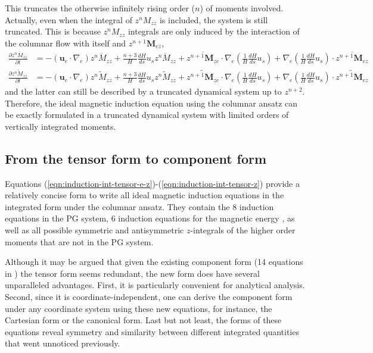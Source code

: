 This truncates the otherwise infinitely rising order ($n$) of moments involved. Actually, even when the integral of $z^nM_{zz}$ is included, the system is still truncated. This is because $z^n M_{zz}$ integrals are only induced by the interaction of the columnar flow with itself and $z^{n+1} \mathbf{M}_{ez}$,
\begin{equation}\label{eqn:induction-int-tensor-z}
\begin{aligned}
    \frac{\partial \overline{z^n M_{zz}}}{\partial t} &= - (\mathbf{u}_e\cdot \nabla_e) \overline{z^n M_{zz}} + \frac{n+3}{H}\frac{dH}{ds} u_s \overline{z^n M_{zz}} + \overline{z^{n+1} \mathbf{M}_{ze}}\cdot \nabla_e \left(\frac{1}{H}\frac{dH}{ds}u_s\right) + \nabla_e \left(\frac{1}{H}\frac{dH}{ds}u_s\right) \cdot \overline{z^{n+1} \mathbf{M}_{ez}} \\ 
    \frac{\partial \widetilde{z^n M_{zz}}}{\partial t} &= - (\mathbf{u}_e\cdot \nabla_e) \widetilde{z^n M_{zz}} + \frac{n+3}{H}\frac{dH}{ds} u_s \widetilde{z^n M_{zz}} + \widetilde{z^{n+1} \mathbf{M}_{ze}}\cdot \nabla_e \left(\frac{1}{H}\frac{dH}{ds}u_s\right) + \nabla_e \left(\frac{1}{H}\frac{dH}{ds}u_s\right) \cdot \widetilde{z^{n+1} \mathbf{M}_{ez}}
\end{aligned}
\end{equation}
and the latter can still be described by a truncated dynamical system up to $z^{n+2}$. Therefore, the ideal magnetic induction equation using the columnar ansatz can be exactly formulated in a truncated dynamical system with limited orders of vertically integrated moments.


\subsection{From the tensor form to component form}

Equations (\ref{eqn:induction-int-tensor-e-z})-(\ref{eqn:induction-int-tensor-z}) provide a relatively concise form to write all ideal magnetic induction equations in the integrated form under the columnar ansatz. They contain the 8 induction equations in the PG system, 6 induction equations for the magnetic energy \citep{jackson_plesio-geostrophy_2020}, as well as all possible symmetric and antisymmetric $z$-integrals of the higher order moments that are not in the PG system.

Although it may be argued that given the existing component form (14 equations in \citet{jackson_plesio-geostrophy_2020}) the tensor form seems redundant, the new form does have several unparalleled advantages.
First, it is particularly convenient for analytical analysis.
Second, since it is coordinate-independent, one can derive the component form under any coordinate system using these new equations, for instance, the Cartesian form or the canonical form.
Last but not least, the forms of these equations reveal symmetry and similarity between different integrated quantities that went unnoticed previously. 

